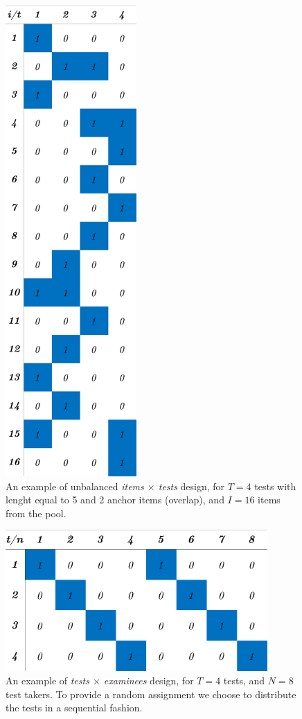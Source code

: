 \begin{figure}[ht]
	\centering
	\includegraphics[width=5cm]{Figures/itemsxtests.png}
	\caption{An example of unbalanced \emph{items $\times$ tests} design, for $T=4$ tests with lenght equal to 5 and 2 anchor items (overlap), and $I=16$ items from the pool.}
	\label{fig:itemsxtests}
\end{figure}
\begin{figure}[ht]
	\centering
	\includegraphics[width=10cm]{Figures/testsxexaminees.png}
	\caption{An example of \emph{tests $\times$ examinees} design, for $T=4$ tests, and $N=8$ test takers. To provide a random assignment we choose to distribute the tests in a sequential fashion.}
	\label{fig:testsxexaminees}
\end{figure}
